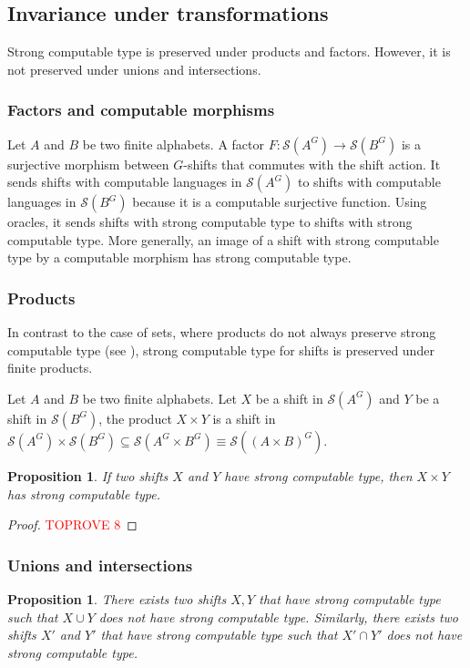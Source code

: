\documentclass[french,american]{article}
\theoremstyle{plain}
\newtheorem{proposition}[theorem]{Proposition}
\theoremstyle{definition}
\theoremstyle{remark}
\theoremstyle{plain}
\begin{document}
\subsection{Invariance under transformations}

Strong computable type is preserved under products and factors. However,
it is not preserved under unions and intersections.

\subsubsection{Factors and computable morphisms}

Let $A$ and $B$ be two finite alphabets. A factor $F:\mathcal{S}(A^{G})\rightarrow\mathcal{S}(B^{G})$
is a surjective morphism between $G$-shifts that commutes with the
shift action. It sends shifts with computable languages in $\mathcal{S}(A^{G})$
to shifts with computable languages in $\mathcal{S}(B^{G})$ because
it is a computable surjective function. Using oracles, it sends shifts
with strong computable type to shifts with strong computable type.
More generally, an image of a shift with strong computable type by
a computable morphism has strong computable type.

\subsubsection{Products}

In contrast to the case of sets, where products do not always preserve strong computable type (see \cite{AMIR2024109020}),
strong computable type for shifts is preserved under finite products. 

Let $A$ and $B$ be two finite alphabets. Let $X$ be a shift in
$\mathcal{S}(A^{G})$ and $Y$ be a shift in $\mathcal{S}(B^{G})$,
the product $X\times Y$ is a shift in $\mathcal{S}(A^{G})\times\mathcal{S}(B^{G})\subseteq\mathcal{S}(A^{G}\times B^{G})\equiv\mathcal{S}((A\times B)^{G})$.
\begin{proposition}
If two shifts $X$ and $Y$ have strong computable type, then $X\times Y$
has strong computable type.
\end{proposition}

\begin{proof}\textcolor{red}{TOPROVE 8}\end{proof}

\subsubsection{Unions and intersections}
\begin{proposition}
There exists two shifts $X,Y$ that have strong computable type such
that $X\cup Y$ does not have strong computable type. Similarly, there exists two shifts $X'$ and $Y'$ that have strong computable type such
that $X'\cap Y'$ does not have strong computable type.
\end{proposition}
\end{document}
